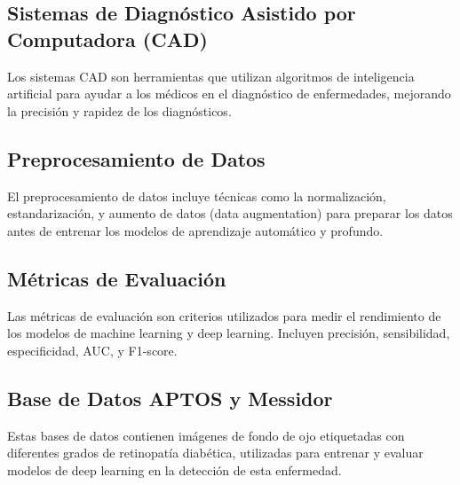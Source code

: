 \subsection{Sistemas de Diagnóstico Asistido por Computadora (CAD)}
Los sistemas CAD son herramientas que utilizan algoritmos de inteligencia artificial para ayudar a los médicos en el diagnóstico de enfermedades, mejorando la precisión y rapidez de los diagnósticos.

\subsection{Preprocesamiento de Datos}
El preprocesamiento de datos incluye técnicas como la normalización, estandarización, y aumento de datos (data augmentation) para preparar los datos antes de entrenar los modelos de aprendizaje automático y profundo.

\subsection{Métricas de Evaluación}
Las métricas de evaluación son criterios utilizados para medir el rendimiento de los modelos de machine learning y deep learning. Incluyen precisión, sensibilidad, especificidad, AUC, y F1-score.

\subsection{Base de Datos APTOS y Messidor}
Estas bases de datos contienen imágenes de fondo de ojo etiquetadas con diferentes grados de retinopatía diabética, utilizadas para entrenar y evaluar modelos de deep learning en la detección de esta enfermedad.
